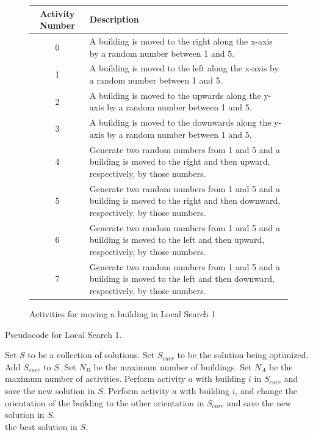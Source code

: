 \begin{figure}
	\begin{center}
		\begin{tabular}{| c | p{110mm} |}
			\hline
			Activity Number & Description \\
			\hline
			0 & A building is moved to the right along the x-axis by a random number between 1 and 5. \\
			1 & A building is moved to the left along the x-axis by a random number between 1 and 5. \\
			2 & A building is moved to the upwards along the y-axis by a random number between 1 and 5. \\
			3 & A building is moved to the downwards along the y-axis by a random number between 1 and 5. \\
			4 & Generate two random numbers from 1 and 5 and a building is moved to the right and then upward, respectively, by those numbers. \\
			5 & Generate two random numbers from 1 and 5 and a building is moved to the right and then downward, respectively, by those numbers. \\
			6 & Generate two random numbers from 1 and 5 and a building is moved to the left and then upward, respectively, by those numbers. \\
			7 & Generate two random numbers from 1 and 5 and a building is moved to the left and then downward, respectively, by those numbers. \\
			\hline
		\end{tabular}
	\end{center}
	\caption{Activities for moving a building in Local Search 1}
	\label{local-search-1-activities}
\end{figure}

\begin{algorithm}
\caption{Pseudocode for Local Search 1.}
\label{pseudocode-local-search-1}
\begin{algorithmic}[1]
\State Set $S$ to be a collection of solutions.
\State Set $S_{curr}$ to be the solution being optimized.
\State Add $S_{curr}$ to $S$.
\State Set $N_{B}$ be the maximum number of buildings.
\State Set $N_{A}$ be the maximum number of activities.
		\State Perform activity $a$ with building $i$ in $S_{curr}$ and save the new solution in $S$.
		\State Perform activity $a$ with building $i$, and change the orientation of the building to the other orientation in $S_{curr}$ and save the new solution in $S$.
	\EndFor
\EndFor \\
\Return the best solution in $S$.
\end{algorithmic}
\end{algorithm}

